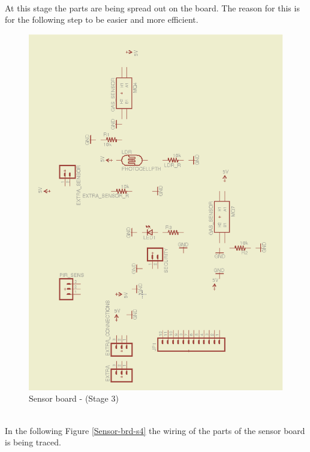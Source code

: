 \documentclass[12pt,a4paper]{report}
\begin{document}
\ \\
At this stage the parts are being spread out on the board.
The reason for this is for the following step to be easier and more efficient.
\ \\
\begin{figure}[H]
\centering
\includegraphics*[scale=0.25]{sens_brd_s3}
\caption{Sensor board -  (Stage 3)}
\label{Sensor-brd-s3}
\end{figure}
\ \\
In the following Figure \ref{Sensor-brd-s4} the wiring of the parts of the sensor board is being traced.
\ \\
\end{document}
